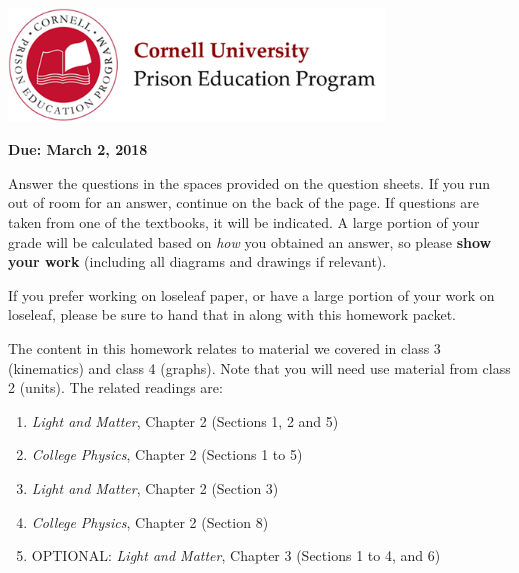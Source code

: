 \documentclass[addpoints,12pt]{exam}
\begin{document}

\begin{flushright}
\vspace{0.2in}

\end{flushright}

\begin{center}
\includegraphics[width=10cm]{../images/logo.png}
\end{center}

\begin{center}
\end{center}
\noindent\begin{large}\textbf{Due: March 2, 2018}\end{large}
\vspace{0.2in}

Answer the questions in the spaces provided on the question sheets. If you run out of room for an answer, continue on the back of the page. If questions are taken from one of the textbooks, it will be indicated. A large portion of your grade will be calculated based on \textit{how} you obtained an answer, so please \textbf{show your work} (including all diagrams and drawings if relevant).

If you prefer working on loseleaf paper, or have a large portion of your work on loseleaf, please be sure to hand that in along with this homework packet.

The content in this homework relates to material we covered in class 3 (kinematics) and class 4 (graphs). Note that you will need use material from class 2 (units). The related readings are:
\begin{enumerate}
	\item \textit{Light and Matter}, Chapter 2 (Sections 1, 2 and 5)
	\item \textit{College Physics}, Chapter 2 (Sections 1 to 5)
	\item \textit{Light and Matter}, Chapter 2 (Section 3)
	\item \textit{College Physics}, Chapter 2 (Section 8)
	\item OPTIONAL: \textit{Light and Matter}, Chapter 3 (Sections 1 to 4, and 6)
\end{enumerate}
\end{document}
